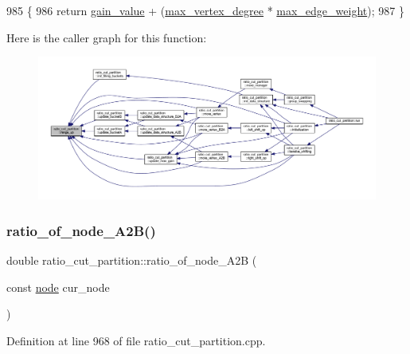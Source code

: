 \begin{DoxyCode}
985 \{
986     \textcolor{keywordflow}{return} \mbox{\hyperlink{classratio__cut__partition_af24ff191abbb0578f0bfc54fef5f6d45}{gain\_value}} + (\mbox{\hyperlink{classratio__cut__partition_ab07041983ab24ac059e8c98192c146e4}{max\_vertex\_degree}} * 
      \mbox{\hyperlink{classratio__cut__partition_a74193c82e8dc7d997780613378919106}{max\_edge\_weight}});
987 \}
\end{DoxyCode}
Here is the caller graph for this function\+:\nopagebreak
\begin{figure}[H]
\begin{center}
\leavevmode
\includegraphics[width=350pt]{classratio__cut__partition_a5cda26b908793b59881798d88b07344c_icgraph}
\end{center}
\end{figure}
\mbox{\label{classratio__cut__partition_add7d355bd4df2cf6fa77ddc791692c88}} 
\subsubsection{\texorpdfstring{ratio\+\_\+of\+\_\+node\+\_\+\+A2\+B()}{ratio\_of\_node\_A2B()}}
{\footnotesize\ttfamily double ratio\+\_\+cut\+\_\+partition\+::ratio\+\_\+of\+\_\+node\+\_\+\+A2B (\begin{DoxyParamCaption}\item[{const \mbox{\hyperlink{classnode}{node}}}]{cur\+\_\+node }\end{DoxyParamCaption})\hspace{0.3cm}{\ttfamily [protected]}}



Definition at line 968 of file ratio\+\_\+cut\+\_\+partition.\+cpp.


